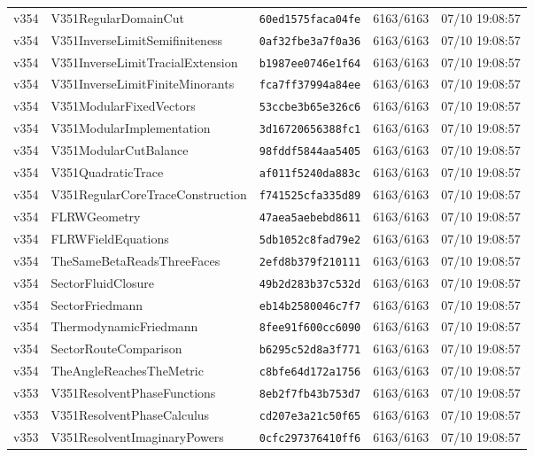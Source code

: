 \documentclass[11pt]{article}
\theoremstyle{definition}\newtheorem{deriv}{Derivação}
\begin{document}
{\begin{longtable}{@{}lllll@{}}
v354 & V351RegularDomainCut & \texttt{60ed1575faca04fe} & 6163/6163 & 07/10 19:08:57 \\
v354 & V351InverseLimitSemifiniteness & \texttt{0af32fbe3a7f0a36} & 6163/6163 & 07/10 19:08:57 \\
v354 & V351InverseLimitTracialExtension & \texttt{b1987ee0746e1f64} & 6163/6163 & 07/10 19:08:57 \\
v354 & V351InverseLimitFiniteMinorants & \texttt{fca7ff37994a84ee} & 6163/6163 & 07/10 19:08:57 \\
v354 & V351ModularFixedVectors & \texttt{53ccbe3b65e326c6} & 6163/6163 & 07/10 19:08:57 \\
v354 & V351ModularImplementation & \texttt{3d16720656388fc1} & 6163/6163 & 07/10 19:08:57 \\
v354 & V351ModularCutBalance & \texttt{98fddf5844aa5405} & 6163/6163 & 07/10 19:08:57 \\
v354 & V351QuadraticTrace & \texttt{af011f5240da883c} & 6163/6163 & 07/10 19:08:57 \\
v354 & V351RegularCoreTraceConstruction & \texttt{f741525cfa335d89} & 6163/6163 & 07/10 19:08:57 \\
v354 & FLRWGeometry & \texttt{47aea5aebebd8611} & 6163/6163 & 07/10 19:08:57 \\
v354 & FLRWFieldEquations & \texttt{5db1052c8fad79e2} & 6163/6163 & 07/10 19:08:57 \\
v354 & TheSameBetaReadsThreeFaces & \texttt{2efd8b379f210111} & 6163/6163 & 07/10 19:08:57 \\
v354 & SectorFluidClosure & \texttt{49b2d283b37c532d} & 6163/6163 & 07/10 19:08:57 \\
v354 & SectorFriedmann & \texttt{eb14b2580046c7f7} & 6163/6163 & 07/10 19:08:57 \\
v354 & ThermodynamicFriedmann & \texttt{8fee91f600cc6090} & 6163/6163 & 07/10 19:08:57 \\
v354 & SectorRouteComparison & \texttt{b6295c52d8a3f771} & 6163/6163 & 07/10 19:08:57 \\
v354 & TheAngleReachesTheMetric & \texttt{c8bfe64d172a1756} & 6163/6163 & 07/10 19:08:57 \\
v353 & V351ResolventPhaseFunctions & \texttt{8eb2f7fb43b753d7} & 6163/6163 & 07/10 19:08:57 \\
v353 & V351ResolventPhaseCalculus & \texttt{cd207e3a21c50f65} & 6163/6163 & 07/10 19:08:57 \\
v353 & V351ResolventImaginaryPowers & \texttt{0cfc297376410ff6} & 6163/6163 & 07/10 19:08:57 \\

\end{longtable}}
\end{document}
